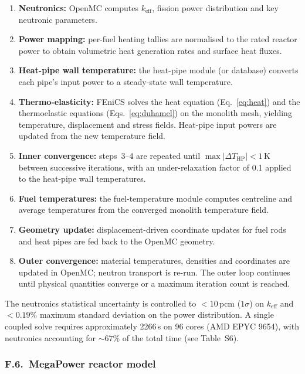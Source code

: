\documentclass[11pt,a4paper]{article}
\newcommand{\keff}{\ensuremath{k_{\mathrm{eff}}}}
\begin{document}
\begin{enumerate}\setlength{\itemsep}{0.2em}
\item \textbf{Neutronics:} OpenMC computes \keff{}, fission power
  distribution and key neutronic parameters.
\item \textbf{Power mapping:} per-fuel heating tallies are normalised to
  the rated reactor power to obtain volumetric heat generation rates and
  surface heat fluxes.
\item \textbf{Heat-pipe wall temperature:} the heat-pipe module (or
  database) converts each pipe's input power to a steady-state wall
  temperature.
\item \textbf{Thermo-elasticity:} FEniCS solves the heat equation
  (Eq.~\ref{eq:heat}) and the thermoelastic equations
  (Eqs.~\ref{eq:duhamel}) on the monolith mesh, yielding temperature,
  displacement and stress fields. Heat-pipe input powers are updated from
  the new temperature field.
\item \textbf{Inner convergence:} steps~3--4 are repeated until
  $\max|\Delta T_{\mathrm{HP}}| < 1$\,K between successive iterations,
  with an under-relaxation factor of 0.1 applied to the heat-pipe wall
  temperatures.
\item \textbf{Fuel temperatures:} the fuel-temperature module computes
  centreline and average temperatures from the converged monolith
  temperature field.
\item \textbf{Geometry update:} displacement-driven coordinate updates
  for fuel rods and heat pipes are fed back to the OpenMC geometry.
\item \textbf{Outer convergence:} material temperatures, densities and
  coordinates are updated in OpenMC; neutron transport is re-run.
  The outer loop continues until physical quantities converge or a
  maximum iteration count is reached.
\end{enumerate}

The neutronics statistical uncertainty is controlled to
$<10$\,pcm ($1\sigma$) on \keff{} and $<0.19\%$ maximum
standard deviation on the power distribution. A single coupled solve
requires approximately 2266\,s on 96 cores (AMD EPYC 9654), with
neutronics accounting for ${\sim}67\%$ of the total time (see
Table~S6).


\subsubsection*{F.6.~MegaPower reactor model}
\end{document}
